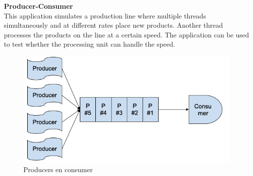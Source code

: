 \begin{oefening}
\textbf{Producer-Consumer}\\
This application simulates a production line where multiple threads simultaneously and at different rates place new products. Another thread processes the products on the line at a certain speed. The application can be used to test whether the processing unit can handle the speed.
 
\begin{figure}[H]
\includegraphics[width=\linewidth]{images/h9/opgave_producer_consumer.png}
\caption{Producers en consumer}
\label{fig:producer_consumer}
\end{figure}


\end{oefening}
